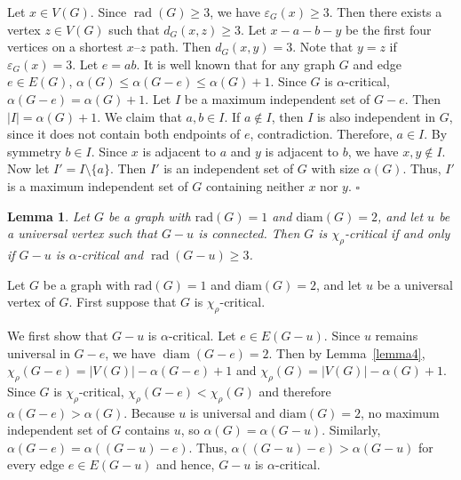 \documentclass[12pt]{article}
\newtheorem{lemma}[theorem]{Lemma}
\newcommand{\proof}{\noindent{\bf Proof.\ }}
\newcommand{\qed}{\hfill $\square$ \bigskip}
\begin{document}
\proof 
Let $x \in V(G)$. Since $\operatorname{rad}(G)\ge 3$, we have $\varepsilon_G(x)\ge 3$. Then there exists a vertex $z \in V(G)$ such that $d_G(x,z)\geq3$. Let $x-a-b-y$ be the first four vertices on a shortest $x$--$z$ path. Then $d_G(x,y)=3$. Note that $y=z$ if $\varepsilon_G(x)=3$.
Let $e=ab$. It is well known that for any graph $G$ and edge $e \in E(G)$,
$\alpha(G) \le \alpha(G-e) \le \alpha(G)+1.$ Since $G$ is $\alpha$-critical, $\alpha(G-e)=\alpha(G)+1$.
Let $I$ be a maximum independent set of $G-e$. Then $|I|=\alpha(G)+1$.
We claim that $a,b \in I$. If $a \notin I$, then $I$ is also independent in $G$, since it does not contain both endpoints of $e$, contradiction. Therefore, $a \in I$. By symmetry $b \in I$.
Since $x$ is adjacent to $a$ and $y$ is adjacent to $b$, we have $x,y \notin I$. Now let $I' = I \setminus \{a\}$.
Then $I'$ is an independent set of $G$ with size $\alpha(G)$. Thus, $I'$ is a maximum independent set of $G$ containing neither $x$ nor $y$.
\qed


\begin{lemma}\label{thm:iff-universal}
Let $G$ be a graph with $\mathrm{rad}(G) = 1$  and  $\mathrm{diam}(G) = 2$, and let $u$ be a universal vertex such that $G-u$ is connected. 
Then $G$ is $\chi_\rho$-critical if and only if $G-u$ is $\alpha$-critical and  $\operatorname{rad}(G-u) \geq 3$. 
\end{lemma}

\proof	Let $G$ be a graph with $\mathrm{rad}(G) = 1$  and  $\mathrm{diam}(G) = 2$, and let $u$ be a universal vertex of $G$. First suppose that $G$ is $\chi_\rho$-critical.
	
We first show that $G-u$ is $\alpha$-critical. Let $e \in E(G-u)$. Since $u$ remains universal in $G-e$, we have $\operatorname{diam}(G-e)=2$. Then by Lemma~\ref{lemma4},
$\chi_\rho(G-e)=|V(G)|-\alpha(G-e)+1$ and $\chi_\rho(G)=|V(G)|-\alpha(G)+1$.
Since $G$ is $\chi_\rho$-critical, $\chi_\rho(G-e)<\chi_\rho(G)$ and therefore $\alpha(G-e)>\alpha(G).$
Because $u$ is universal and $\mathrm{diam}(G) = 2$, no maximum independent set of $G$ contains $u$, so $\alpha(G)=\alpha(G-u)$. Similarly, $\alpha(G-e)=\alpha((G-u)-e).$
Thus, $\alpha((G-u)-e)>\alpha(G-u)$ for every edge $e \in E(G-u)$ and hence, $G-u$ is $\alpha$-critical.
\end{document}
